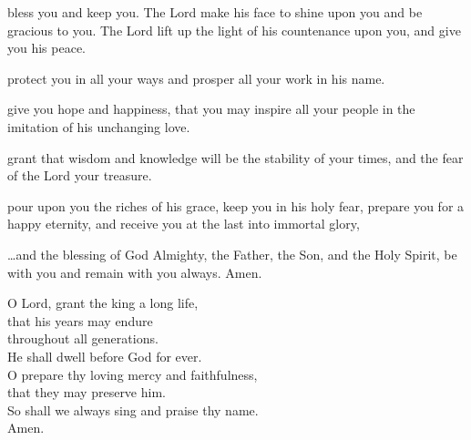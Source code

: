 {

\clearpage




 bless you and keep you.
The Lord make his face to shine upon you and be gracious to you.
The Lord lift up the light of his countenance upon you, and give you his peace.



 protect you in all your ways and prosper all your work in his name.
\vspace{1ex}



 give you hope and happiness, that you may inspire all your people in
the imitation of his unchanging love.


 grant that wisdom and knowledge will be the stability of your times,
and the fear of the Lord your treasure.




 pour upon you the riches of his grace,
keep you in his holy fear,
prepare you for a happy eternity,
and receive you at the last into immortal glory,


 …and the blessing of God Almighty,
the Father, the Son, and the Holy Spirit,
be with you and remain with you always. Amen.

\vfill 



\begin{center}
O Lord, grant the king a long life,\\that his years may endure\\
throughout all generations.\\
He shall dwell before God for ever.\\
O prepare thy loving mercy and faithfulness,\\that they may preserve him.\\
So shall we always sing and praise thy name.\\
Amen.
\end{center}\clearpage


}
